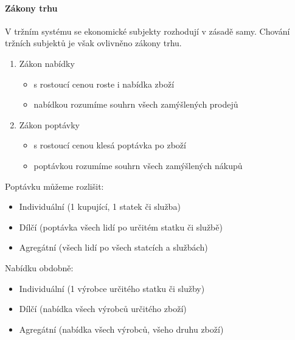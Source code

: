 \documentclass[11pt,a4paper,twoside]{book}
\begin{document}
	\paragraph*{Zákony trhu}
	
	V tržním systému se ekonomické subjekty rozhodují v zásadě samy. Chování tržních subjektů je však ovlivněno zákony trhu.
	
	\begin{enumerate}
		\item Zákon nabídky
		\begin{itemize}
			\item s rostoucí cenou roste i nabídka zboží
			\item nabídkou rozumíme souhrn všech zamýšlených prodejů
		\end{itemize}
		\item Zákon poptávky
		\begin{itemize}
			\item s rostoucí cenou klesá poptávka po zboží
			\item poptávkou rozumíme souhrn všech zamýšlených nákupů
		\end{itemize}
	\end{enumerate}
	
	Poptávku můžeme rozlišit:
	\begin{itemize}
		\item Individuální (1 kupující, 1 statek či služba)
		\item Dílčí (poptávka všech lidí po určitém statku či službě)
		\item Agregátní (všech lidí po všech statcích a službách)
	\end{itemize}
	
	Nabídku obdobně:
	\begin{itemize}
		\item Individuální (1 výrobce určitého statku či služby)
		\item Dílčí (nabídka všech výrobců určitého zboží)
		\item Agregátní (nabídka všech výrobců, všeho druhu zboží)
	\end{itemize}
	
\end{document}
